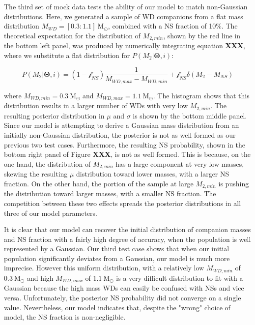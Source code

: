 \documentclass[letterpaper,12pt,preprint]{aastex}
\newcommand{\Msun}{\mathrm{M}_\odot}
\begin{document}
The third set of mock data tests the ability of our model to match non-Gaussian distributions. Here, we generated a sample of WD companions from a flat mass distribution $M_{WD} = [0.3:1.1]~\Msun$, combined with a NS fraction of 10\%. The theoretical expectation for the distribution of $M_{2,min}$, shown by the red line in the bottom left panel, was produced by numerically integrating equation {\bf XXX}, where we substitute a flat distribution for $P(M_2 | \mathbf{\Theta},i)$:

\begin{equation}
P(M_2 | \mathbf{\Theta},i) = \left( 1 - \mathcal{f}_{NS} \right) \frac{1}{M_{WD,max} - M_{WD,min}} + \mathcal{f}_{NS} \delta(M_2 - M_{NS})
\end{equation}

where $M_{WD,min}=0.3~\Msun$ and $M_{WD,max} = 1.1~\Msun$. The histogram shows that this distribution results in a larger number of WDs with very low $M_{2,min}$. The resulting posterior distribution in $\mu$ and $\sigma$ is shown by the bottom middle panel. Since our model is attempting to derive a Gaussian mass distribution from an initially non-Gaussian distribution, the posterior is not as well formed as our previous two test cases. Furthermore, the resulting NS probability, shown in the bottom right panel of Figure {\bf XXX}, is not as well formed. This is because, on the one hand, the distribution of $M_{2,min}$ has a large component at very low masses, skewing the resulting $\mu$ distribution toward lower masses, with a larger NS fraction. On the other hand, the portion of the sample at large $M_{2,min}$ is pushing the distribution toward larger masses, with a smaller NS fraction. The competition between these two effects spreads the posterior distributions in all three of our model parameters.

It is clear that our model can recover the initial distribution of companion masses and NS fraction with a fairly high degree of accuracy, when the population is well represented by a Gaussian. Our third test case shows that when our initial population significantly deviates from a Gaussian, our model is much more imprecise. However this uniform distribution, with a relatively low $M_{WD,min}$ of $0.3~\Msun$ and high $M_{WD,max}$ of $1.1~\Msun$ is a very difficult distribution to fit with a Gaussian because the high mass WDs can easily be confused with NSs and vice versa. Unfortunately, the posterior NS probability did not converge on a single value. Nevertheless, our model indicates that, despite the "wrong" choice of model, the NS fraction is non-negligible.
\end{document}

